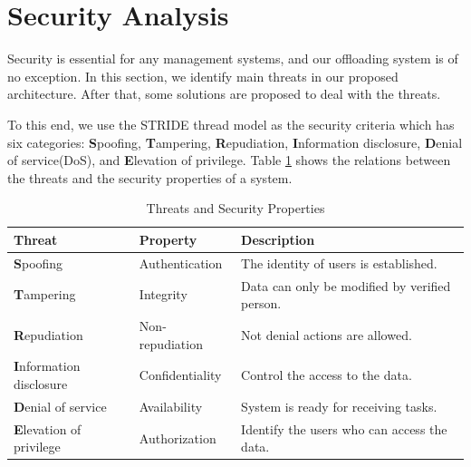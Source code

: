 \section{Security Analysis}\label{sec:security_analysis}

Security is essential for any management systems, and our offloading system is of no exception. 
In this section, we identify main threats in our proposed architecture. After that, some solutions are proposed to deal with the threats. 

To this end, we use the STRIDE thread model\cite{hernan2006threat} as the security criteria which has six categories: \textbf{S}poofing, \textbf{T}ampering, \textbf{R}epudiation, \textbf{I}nformation disclosure, \textbf{D}enial of service(DoS), and \textbf{E}levation of privilege. Table \ref{tab:threat-property} shows the relations between the threats and the security properties of a system.

\begin{table}[htbp]
\caption{Threats and Security Properties}
\begin{center}
\begin{tabular}{|p{85pt}||p{65pt}|p{200pt}|}
\hline
Threat & Property & Description \\
\hline
\textbf{S}poofing & Authentication & The identity of users is established.\\
\textbf{T}ampering & Integrity & Data can only be modified by verified person.\\
\textbf{R}epudiation & Non-repudiation & Not denial actions are allowed.\\
\textbf{I}nformation disclosure & Confidentiality & Control the access to the data.\\
\textbf{D}enial of service & Availability  & System is ready for receiving tasks.\\
\textbf{E}levation of privilege & Authorization & Identify the users who can access the data. \\
\hline
\end{tabular}
\label{tab:threat-property}
\end{center}
\end{table}

